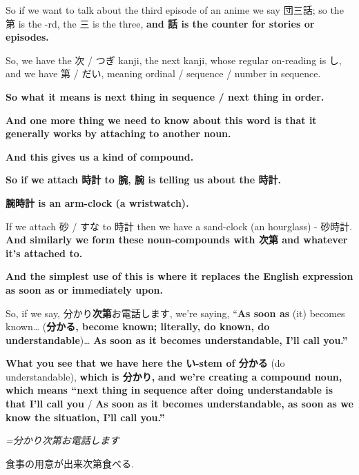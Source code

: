 So if we want to talk about the third episode of an anime we say 団三話; so the 第 is the -rd, the 三 is the three, {\bf and 話 is the counter for stories or episodes.}

{}

So, we have the 次 / つぎ kanji, the next kanji, whose regular on-reading is し, and we have 第 / だい, meaning ordinal / sequence / number in sequence.

{\bf So what it means is next thing in sequence / next thing in order.}

{\bf And one more thing we need to know about this word is that it generally works by attaching to another noun.}

{\bf And this gives us a kind of compound.}

\thinrule

{\bf So if we attach 時計 to 腕, 腕 is telling us about the 時計.}

{\bf 腕時計 is an arm-clock (a wristwatch).}

If we attach 砂 / すな to 時計 then we have a sand-clock (an hourglass) - 砂時計. {\bf And similarly we form these noun-compounds with 次第 and whatever it's attached to.}

\stopsectionlevel

\startsectionlevel[title={次第 as as soon as or immediately upon},reference={次第-as-as-soon-as-or-immediately-upon}]

{\bf And the simplest use of this is where it replaces the English expression as soon as or immediately upon.}

{}

So, if we say, 分かり{\bf 次第}お電話します, we're saying, “{\bf As soon as} (it) becomes known\ldots{} ({\bf 分かる, become known; literally, do known, do understandable})\ldots{} {\bf As soon as it becomes understandable, I'll call you.”}

\thinrule

{\bf What you see that we have here the い-stem of 分かる} (do understandable), {\bf which is 分かり,} {\bf and we're creating a compound noun, which means “next thing in sequence after doing understandable is that I'll call you} / {\bf As soon as it becomes understandable, as soon as we know the situation, I'll call you.”}

{\em =分かり次第お電話します}

\thinrule

食事の用意が出来次第食べる.

